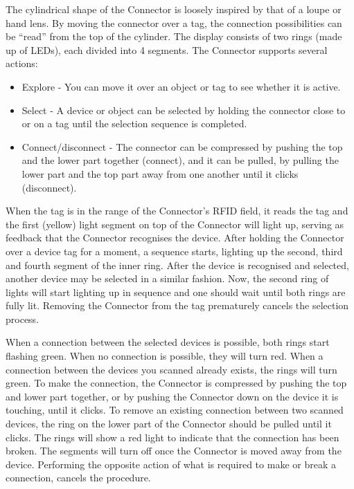 The cylindrical shape of the Connector is loosely inspired by that of a loupe or hand lens. By moving the connector over a tag, the connection possibilities can be ``read'' from the top of the cylinder. The display consists of two rings (made up of LEDs), each divided into 4 segments. The Connector supports several actions:

\begin{itemize}
	\item Explore - You can move it over an object or tag to see whether it is active.
	\item Select - A device or object can be selected by holding the connector close to or on a tag until the selection sequence is completed.
	\item Connect/disconnect - The connector can be compressed by pushing the top and the lower part together (connect), and it can be pulled, by pulling the lower part and the top part away from one another until it clicks (disconnect).
\end{itemize}   

When the tag is in the range of the Connector's \ac{RFID} field, it reads the tag and the first (yellow) light segment on top of the Connector will light up, serving as feedback that the Connector recognises the device. After holding the Connector over a device tag for a moment, a sequence starts, lighting up the second, third and fourth segment of the inner ring. After the device is recognised and selected, another device may be selected in a similar fashion. Now, the second ring of lights will start lighting up in sequence and one should wait until both rings are fully lit. Removing the Connector from the tag prematurely cancels the selection process.

When a connection between the selected devices is possible, both rings start flashing green. When no connection is possible, they will turn red. When a connection between the devices you scanned already exists, the rings will turn green. To make the connection, the Connector is compressed by pushing the top and lower part together, or by pushing the Connector down on the device it is touching, until it clicks. To remove an existing connection between two scanned devices, the ring on the lower part of the Connector should be pulled until it clicks. The rings will show a red light to indicate that the connection has been broken. The segments will turn off once the Connector is moved away from the device. Performing the opposite action of what is required to make or break a connection, cancels the procedure.

